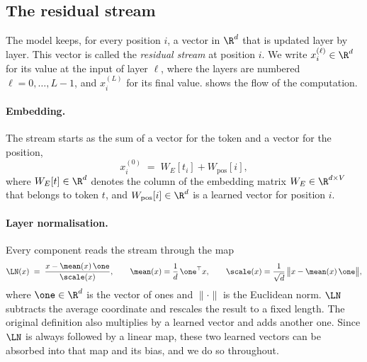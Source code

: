 \subsection{The residual stream}

The model keeps, for every position $i$, a vector in $\R^d$ that is updated layer by layer. This vector is called
the \emph{residual stream} at position $i$. We write $x_i^{(\ell)}\in\R^d$ for its value at the input of layer
$\ell$, where the layers are numbered $\ell=0,\dots,L-1$, and $x_i^{(L)}$ for its final value.
 shows the flow of the computation.

\paragraph{Embedding.} The stream starts as the sum of a vector for the token and a vector for the position,
\begin{equation}\label{eq:embed}
x_i^{(0)} \;=\; W_E[t_i] + W_{\mathrm{pos}}[i],
\end{equation}
where $W_E[t]\in\R^d$ denotes the column of the embedding matrix $W_E\in\R^{d\times V}$ that belongs to token $t$,
and $W_{\mathrm{pos}}[i]\in\R^d$ is a learned vector for position $i$.

\paragraph{Layer normalisation.} Every component reads the stream through the map
\begin{equation}\label{eq:ln}
\LN(x) \;=\; \frac{x-\mean(x)\,\one}{\scale(x)},\qquad
\mean(x)=\frac1d\,\one^\top x,\qquad
\scale(x)=\frac{1}{\sqrt d}\,\big\|x-\mean(x)\,\one\big\|,
\end{equation}
where $\one\in\R^d$ is the vector of ones and $\|\cdot\|$ is the Euclidean norm. $\LN$ subtracts the average coordinate and rescales the result to a
fixed length. The original definition also multiplies by a learned vector and adds another one. Since $\LN$ is
always followed by a linear map, these two learned vectors can be absorbed into that map and its bias, and we do
so throughout.

